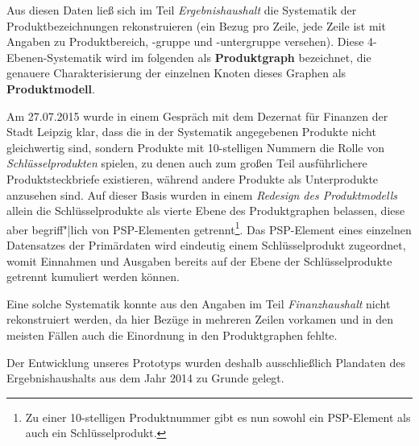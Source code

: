 \documentclass[a4paper,11pt,twoside]{article}
\begin{document}
Aus diesen Daten ließ sich im Teil \emph{Ergebnishaushalt} die Systematik der
Produktbezeichnungen rekonstruieren (ein Bezug pro Zeile, jede Zeile ist mit
Angaben zu Produktbereich, -gruppe und -untergruppe versehen).  Diese
4-Ebenen-Systematik wird im folgenden als \textbf{Produktgraph} bezeichnet, die
genauere Charakterisierung der einzelnen Knoten dieses Graphen als
\textbf{Produktmodell}. 

Am 27.07.2015 wurde in einem Gespräch mit dem Dezernat für Finanzen der Stadt
Leipzig klar, dass die in der Systematik angegebenen Produkte nicht
gleichwertig sind, sondern Produkte mit 10-stelligen Nummern die Rolle von
\emph{Schlüsselprodukten} spielen, zu denen auch zum großen Teil ausführlichere
Produktsteckbriefe existieren, während andere Produkte als Unterprodukte
anzusehen sind. Auf dieser Basis wurden in einem \emph{Redesign des
  Produktmodells} allein die Schlüsselprodukte als vierte Ebene des
Produktgraphen belassen, diese aber begriff"|lich von PSP-Elementen
getrennt\footnote{Zu einer 10-stelligen Produktnummer gibt es nun sowohl ein
  PSP-Element als auch ein Schlüsselprodukt.}. Das PSP-Element eines einzelnen
Datensatzes der Primärdaten wird eindeutig einem Schlüsselprodukt zugeordnet,
womit Einnahmen und Ausgaben bereits auf der Ebene der Schlüsselprodukte
getrennt kumuliert werden können.

Eine solche Systematik konnte aus den Angaben im Teil \emph{Finanzhaushalt}
nicht rekonstruiert werden, da hier Bezüge in mehreren Zeilen vorkamen und in
den meisten Fällen auch die Einordnung in den Produktgraphen fehlte.

Der Entwicklung unseres Prototyps wurden deshalb ausschließlich Plandaten des
Ergebnishaushalts aus dem Jahr 2014 zu Grunde gelegt.
\end{document}
